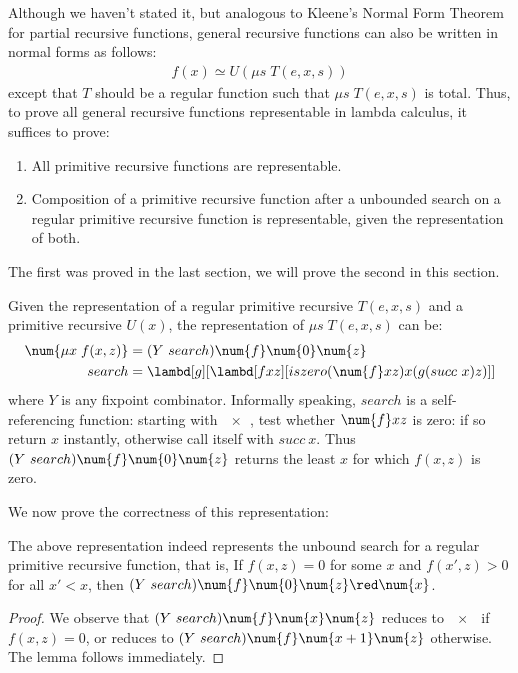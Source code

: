 \documentclass[../../../include/open-logic-section]{subfiles}
\begin{document}

Although we haven't stated it, but analogous to Kleene's Normal Form
Theorem for partial recursive functions, general recursive functions
can also be written in normal forms as follows:
\begin{align*}
  f(x) \simeq U(\mu s \; T(e,x,s))
\end{align*}
except that $T$ should be a regular function such that $\mu s \; T(e,x,s)$
is total. Thus, to prove all general recursive functions
representable in lambda calculus, it suffices to prove:

\begin{enumerate}
\item All primitive recursive functions are representable.
\item Composition of a primitive recursive function after a
  unbounded search on a regular primitive recursive function
  is representable, given the representation of both.
\end{enumerate}

The first was proved in the last section, we will prove the second in
this section.

Given the representation of a regular primitive recursive
$T(e,x,s)$ and a primitive recursive $U(x)$, the representation of
$\mu s \; T(e,x,s)$ can be:
\begin{align*}
  \num{\mu x \; f(x,z)} &= (Y ~ search) \num{f} \num{0} \num{z} \\
  search &= \lambd[g][\lambd[fxz][iszero (\num{f} x z) x (g (succ ~ x)
           z)]]
\end{align*}
where $Y$ is any fixpoint combinator. Informally speaking, $search$ is
a self-referencing function: starting with $\num{x}$, test whether $\num{f} x
z$ is zero: if so return $x$ instantly, otherwise call itself
with $succ ~ x$. Thus $(Y ~ search) \num{f} \num{0} \num{z}$ returns
the least $x$ for which $f(x,z)$ is zero.

We now prove the correctness of this representation:
\begin{lem}
  The above representation indeed represents the unbound search for
  a regular primitive recursive function, that is,
  If $f(x,z) = 0$ for some $x$ and $f(x',z) > 0$ for all $x' < x$,
    then $(Y ~ search) \num{f} \num{0} \num{z} \red \num{x}$.
\end{lem}
\begin{proof}
  We observe that $(Y ~ search) \num{f} \num{x} \num{z}$ reduces to $\num{x}$ if
  $f(x,z)=0$, or reduces to $(Y ~ search) \num{f} \num{x+1} \num{z}$
  otherwise. The lemma follows immediately.
\end{proof}
\end{document}
